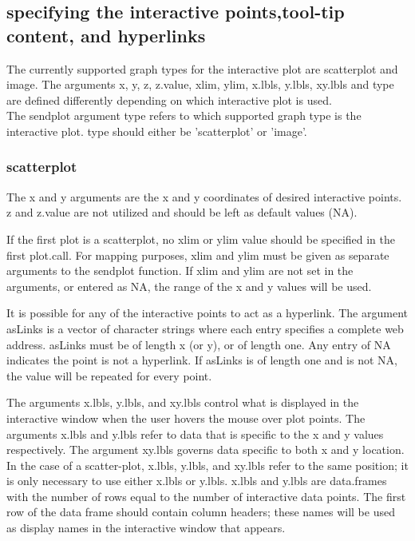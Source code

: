 \documentclass[]{article}
\begin{document}
\subsection{specifying the interactive points,tool-tip content, and hyperlinks}


\indent The currently supported graph types for the interactive plot are scatterplot and image. The arguments x, y, z, z.value, xlim, ylim, x.lbls, y.lbls, xy.lbls and type are defined differently depending on which interactive plot is used. \\
\indent The sendplot argument type refers to which supported graph type is the interactive plot. type should either be 'scatterplot' or 'image'.

\subsubsection{scatterplot}

\indent The x and y arguments are the x and y coordinates of desired interactive points. z and z.value are not utilized and should be left as default values (NA). 

\indent If the first plot is a scatterplot, no xlim or ylim value should be specified in the first plot.call. For mapping purposes, xlim and ylim must be given as separate arguments to the sendplot function. If xlim and ylim are not set in the arguments, or entered as NA, the range of the x and y values will be used.\newline

\indent It is possible for any of the interactive points to act as a hyperlink. The argument asLinks is a vector of character strings where each entry specifies a complete web address. asLinks must be of length x (or y), or of length one. Any entry of NA indicates the point is not a hyperlink. If asLinks is of length one and is not NA, the value will be repeated for every point. \newline

\indent The arguments x.lbls, y.lbls, and xy.lbls control what is displayed in the interactive window when the user hovers the mouse over plot points. The arguments x.lbls and y.lbls refer to data that is specific to the x and y values respectively. The argument xy.lbls governs data specific to both x and y location. In the case of a scatter-plot, x.lbls, y.lbls, and xy.lbls refer to the same position; it is only necessary to use either x.lbls or y.lbls. x.lbls and y.lbls are data.frames with the number of rows equal to the number of interactive data points. The first row of the data frame should contain column headers; these names will be used as display names in the interactive window that appears. \newline
\end{document}
